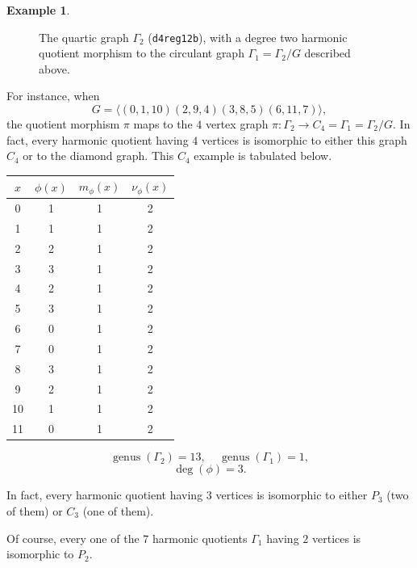 \documentclass[12pt,letterpaper]{article}
\theoremstyle{definition}
\newtheorem{example}[theorem]{Example}
\DeclareMathOperator{\genus}{genus}
\begin{document}
\begin{example}
{\begin{figure}[H]
\begin{minipage}{\textwidth}
\begin{center}
%
\end{center}
\end{minipage}
\caption{The quartic graph $\Gamma_2$ ({\tt d4reg12b}), with a degree two harmonic quotient morphism to the circulant graph $\Gamma_1=\Gamma_2/G$ described above.}
\label{fig:harmonic-quotient_d4reg12b+circ6-1245}
\end{figure}

For instance, when
\[
G = \langle (0,1,10)(2,9,4)(3,8,5)(6,11,7) \rangle ,
\]
the quotient morphism $\pi$ maps to the $4$ vertex graph
$\pi: \Gamma_2\to C_4=\Gamma_1=\Gamma_2/G $.
In fact, every harmonic quotient having $4$ vertices is isomorphic to
either this graph $C_4$ or to the diamond graph. This $C_4$ example
is tabulated below.

\begin{center}
\begin{tabular}{c|c|c|c}  
  $x$ & $\phi(x)$ & $m_\phi(x)$ & $\nu_\phi(x)$ \\ \hline
  0   &    1   &        1         &  2   \\ 
  1   &    1   &        1         &  2  \\ 
  2   &    2   &        1         &  2  \\ 
  3   &    3   &        1         &  2  \\ 
  4   &    2   &        1         &  2   \\
  5   &    3   &        1         &  2   \\
  6   &    0   &        1         &  2   \\
  7   &    0   &        1         &  2   \\
  8   &    3   &        1         &  2   \\
  9   &    2   &        1         &  2   \\
  10   &   1   &        1         &  2  \\   
  11   &   0   &        1         &  2  \\
\end{tabular}
\end{center}

\[
  \genus(\Gamma_2) =13,\ \ \ \ \
  \genus(\Gamma_1) =1,
\]
\[
\deg(\phi) =3.
\]

In fact, every harmonic quotient having $3$ vertices is isomorphic to
either $P_3$ (two of them) or $C_3$ (one of them).

Of course, every one of the $7$ harmonic quotients $\Gamma_1$ having $2$
vertices is isomorphic to $P_2$.

}
\end{example}
\end{document}
